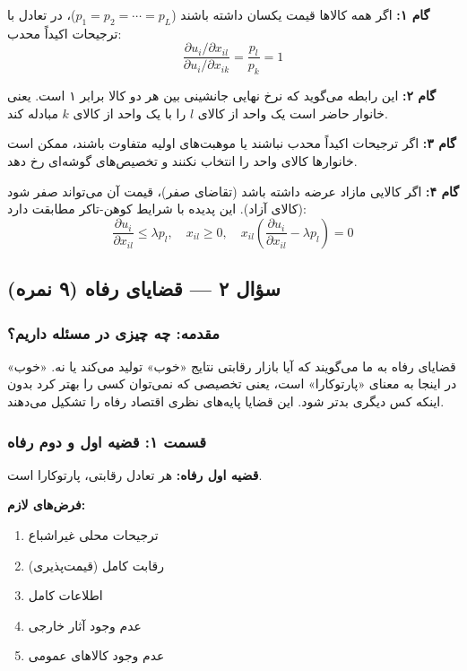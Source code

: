 \documentclass[12pt,a4paper]{article}
\begin{document}
\textbf{گام ۱:} اگر همه کالاها قیمت یکسان داشته باشند ($p_1 = p_2 = \cdots = p_L$)، در تعادل با ترجیحات اکیداً محدب:
\[
	\frac{\partial u_i / \partial x_{il}}{\partial u_i / \partial x_{ik}} = \frac{p_l}{p_k} = 1
\]

\textbf{گام ۲:} این رابطه می‌گوید که نرخ نهایی جانشینی بین هر دو کالا برابر ۱ است. یعنی خانوار حاضر است یک واحد از کالای $l$ را با یک واحد از کالای $k$ مبادله کند.

\textbf{گام ۳:} اگر ترجیحات اکیداً محدب نباشند یا موهبت‌های اولیه متفاوت باشند، ممکن است خانوارها کالای واحد را انتخاب نکنند و تخصیص‌های گوشه‌ای رخ دهد.

\textbf{گام ۴:} اگر کالایی مازاد عرضه داشته باشد (تقاضای صفر)، قیمت آن می‌تواند صفر شود (کالای آزاد). این پدیده با شرایط کوهن-تاکر مطابقت دارد:
\[
	\frac{\partial u_i}{\partial x_{il}} \leq \lambda p_l, \quad x_{il} \geq 0, \quad x_{il} \left( \frac{\partial u_i}{\partial x_{il}} - \lambda p_l \right) = 0
\]

\subsection{سؤال ۲ — قضایای رفاه (۹ نمره)}

\subsubsection{مقدمه: چه چیزی در مسئله داریم؟}

قضایای رفاه به ما می‌گویند که آیا بازار رقابتی نتایج «خوب» تولید می‌کند یا نه. «خوب» در اینجا به معنای «پارتوکارا» است، یعنی تخصیصی که نمی‌توان کسی را بهتر کرد بدون اینکه کس دیگری بدتر شود. این قضایا پایه‌های نظری اقتصاد رفاه را تشکیل می‌دهند.

\subsubsection{قسمت ۱: قضیه اول و دوم رفاه}

\textbf{قضیه اول رفاه:} هر تعادل رقابتی، پارتوکارا است.

\textbf{فرض‌های لازم:}
\begin{enumerate}
	\item ترجیحات محلی غیراشباع
	\item رقابت کامل (قیمت‌پذیری)
	\item اطلاعات کامل
	\item عدم وجود آثار خارجی
	\item عدم وجود کالاهای عمومی
\end{enumerate}
\end{document}
